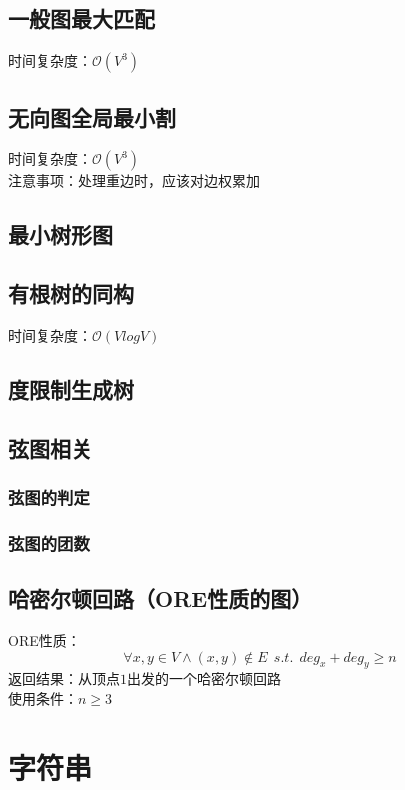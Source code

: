 \documentclass[openany, a4paper, 10pt]{book}
\begin{document}
\begin{spacing}{1.0}
		\section{一般图最大匹配}
			时间复杂度：$\mathcal{O}(V^3)$
			
		\section{无向图全局最小割}
			时间复杂度：$\mathcal{O}(V^3)$\\
			\indent 注意事项：处理重边时，应该对边权累加
			
		\section{最小树形图}
			
		\section{有根树的同构}
			时间复杂度：$\mathcal{O}(V log V)$
			
		\section{度限制生成树}
			
		\section{弦图相关}
			\subsection{弦图的判定}
				
			\subsection{弦图的团数}
				
		\section{哈密尔顿回路（ORE性质的图）}
			ORE性质：$$\forall x,y \in V \wedge (x,y) \notin E \ \ s.t. \ \ deg_x+deg_y \geq n$$
			\indent 返回结果：从顶点$1$出发的一个哈密尔顿回路\\
			\indent 使用条件：$n \geq 3$
			
	\chapter{字符串}

\end{spacing}
\end{document}
